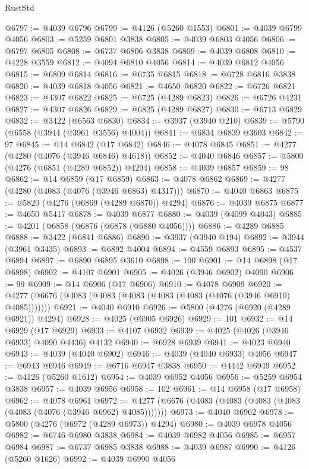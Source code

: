 \begin{lexlean}{RustStd}
\begin{coremodule}
@6797 := @4039 @6796
@6799 := @4126 (@5260 @1553)
@6801 := @4039 @6799 @4056
@6803 := @5259 @6801 @3838
@6805 := @4039 @6803 @4056
@6806 := @6797 @6805
@6808 := @6737 @6806 @3838
@6809 := @4039 @6808
@6810 := @4228 @3559
@6812 := @4094 @6810 @4056
@6814 := @4039 @6812 @4056
@6815 := @6809 @6814
@6816 := @6735 @6815
@6818 := @6728 @6816 @3838
@6820 := @4039 @6818 @4056
@6821 := @4650 @6820
@6822 := @6726 @6821
@6823 := @4307 @6822
@6825 := @6725 (@4289 @6823)
@6826 := @6726 @4231
@6827 := @4307 @6826
@6829 := @6825 (@4289 @6827)
@6830 := @6713 @6829
@6832 := @3422 (@6563 @6830)
@6834 := @3937 (@3940 @210)
@6839 := @5790 (@6558 (@3944 (@3961 @3556) @4004))
@6841 := @6834 @6839 @3603
@6842 := 97
@6845 := @14 @6842 (@17 @6842)
@6846 := @4078 @6845
@6851 := @4277 (@4280 (@4076 (@3946 @6846) @4618))
@6852 := @4040 @6846
@6857 := @5800 (@4276 (@6851 (@4289 @6852)) @4294)
@6858 := @4039 @6857
@6859 := 98
@6862 := @14 @6859 (@17 @6859)
@6863 := @4078 @6862
@6869 := @4277 (@4280 (@4083 (@4076 (@3946 @6863) @4317)))
@6870 := @4040 @6863
@6875 := @5820 (@4276 (@6869 (@4289 @6870)) @4294)
@6876 := @4039 @6875
@6877 := @4650 @5417
@6878 := @4039 @6877
@6880 := @4039 (@4099 @4043)
@6885 := @4201 (@6858 (@6876 (@6878 (@6880 @4056))))
@6886 := @4289 @6885
@6888 := @3422 (@6841 @6886)
@6890 := @3937 (@3940 @194)
@6892 := @3944 (@3961 @3435)
@6893 := @6892 @4004
@6894 := @4559 @6893
@6895 := @4537 @6894
@6897 := @6890 @6895 @3610
@6898 := 100
@6901 := @14 @6898 (@17 @6898)
@6902 := @4107 @6901
@6905 := @4026 (@3946 @6902) @4090
@6906 := 99
@6909 := @14 @6906 (@17 @6906)
@6910 := @4078 @6909
@6920 := @4277 (@6676 (@4083 (@4083 (@4083 (@4083 (@4083 (@4076 (@3946 @6910) @4085)))))))
@6921 := @4040 @6910
@6926 := @5800 (@4276 (@6920 (@4289 @6921)) @4294)
@6928 := @4025 (@6905 @6926)
@6929 := 101
@6932 := @14 @6929 (@17 @6929)
@6933 := @4107 @6932
@6939 := @4025 (@4026 (@3946 @6933) @4090 @4436) @4132
@6940 := @6928 @6939
@6941 := @4023 @6940
@6943 := @4039 (@4040 @6902)
@6946 := @4039 (@4040 @6933) @4056
@6947 := @6943 @6946
@6949 := @6716 @6947 @3838
@6950 := @4442 @6949
@6952 := @4126 (@5260 @1612)
@6954 := @4039 @6952 @4056
@6956 := @5259 @6954 @3838
@6957 := @4039 @6956
@6958 := 102
@6961 := @14 @6958 (@17 @6958)
@6962 := @4078 @6961
@6972 := @4277 (@6676 (@4083 (@4083 (@4083 (@4083 (@4083 (@4076 (@3946 @6962) @4085)))))))
@6973 := @4040 @6962
@6978 := @5800 (@4276 (@6972 (@4289 @6973)) @4294)
@6980 := @4039 @6978 @4056
@6982 := @6746 @6980 @3838
@6984 := @4039 @6982 @4056
@6985 := @6957 @6984
@6987 := @6737 @6985 @3838
@6988 := @4039 @6987
@6990 := @4126 (@5260 @1626)
@6992 := @4039 @6990 @4056

\end{coremodule}
\end{lexlean}
